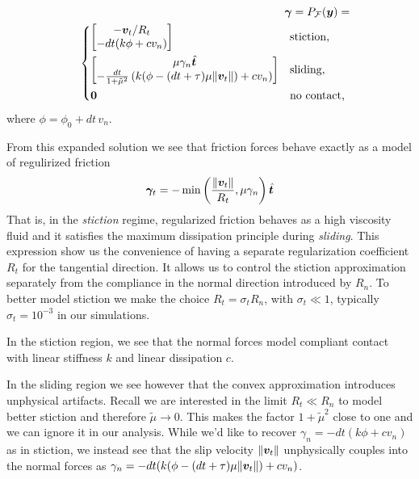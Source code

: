 \begin{eqnarray}
	&&\bgamma = P_\mathcal{F}(\vf{y}) = \\
&&\begin{dcases}
	\begin{bmatrix}
		-\vf{v}_t/R_t\\
		-dt(k\phi + c v_n)
	\end{bmatrix}
	& \text{stiction, } \\
	\begin{bmatrix}
		\mu\gamma_n\hat{\vf{t}}\\
		-\frac{dt}{1+\tilde\mu^2}\left(k(\phi-(dt+\tau)\mu\Vert\vf{v}_t\Vert) + cv_n \right)
	\end{bmatrix}
	& \text{sliding, }\\
    \vf{0} & \text{no contact, }
\end{dcases}\nonumber
	\label{eq:gamma_piecewise}
\end{eqnarray}
where $\phi= \phi_0 + dt\,v_n$.

From this expanded solution we see that friction forces behave exactly as a
model of regulirized friction
\begin{equation}
	{\bm\gamma}_t = -\min\left(\frac{\Vert{\bm{v}}_t\Vert}{R_t}, \mu\gamma_n\right)\hat{{\bm{t}}}
\end{equation}
That is, in the \textit{stiction} regime, regularized friction behaves as a high
viscosity fluid and it satisfies the maximum dissipation principle during
\textit{sliding}. This expression show us the convenience of having a separate
regularization coefficient $R_t$ for the tangential direction. It allows us to
control the stiction approximation separately from the compliance in the normal
direction introduced by $R_n$. To better model stiction we make the choice
$R_t=\sigma_t R_n$, with $\sigma_t \ll 1$, typically $\sigma_t=10^{-3}$ in our
simulations.

In the stiction region, we see that the normal forces model compliant contact
with linear stiffness $k$ and linear dissipation $c$. 

In the sliding region we see however that the convex approximation introduces
unphysical artifacts. Recall we are interested in the limit $R_t \ll R_n$ to
model better stiction and therefore $\tilde\mu \rightarrow 0$. This makes the
factor $1+\tilde{\mu}^2$ close to one and we can ignore it in our analysis.
While we'd like to recover $\gamma_n = -dt(k\phi + c v_n)$ as in stiction, we
instead see that the slip velocity $\Vert{\bm{v}}_t\Vert$ unphysically couples
into the normal forces as $\gamma_n=-dt(k(\phi-(dt+\tau)\mu\Vert{\bm{v}}_t\Vert) +
cv_n)$. 

